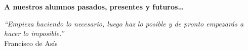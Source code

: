 % 
% 
% 
% 
% 
% 
% 
% 

% 
% 

\thispagestyle{empty}

\begin{flushright}

  \vspace*{\fill}

  \textbf{A nuestros alumnos pasados, presentes y futuros\ldots}\\

  \vspace{3cm}

  \emph{``Empieza haciendo lo necesario, luego haz lo posible y de
    pronto empezarás a hacer lo imposible.''}\\ Francisco de Asís

\end{flushright}  

\vspace{4cm}
\vspace*{\fill}




